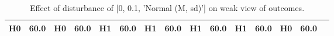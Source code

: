 \begin{table}
\begin{tabular}{l|cc|cc|cc|cc|cc|cc|cc}
\cellcolor{Bittersweet}H0&\cellcolor{Bittersweet}60.0&\cellcolor{Bittersweet}H0&\cellcolor{Bittersweet}60.0&\cellcolor{Bittersweet}H1&\cellcolor{Bittersweet}60.0&\cellcolor{Bittersweet}H1&\cellcolor{Bittersweet}60.0&\cellcolor{Bittersweet}H1&\cellcolor{Bittersweet}60.0&\cellcolor{Bittersweet}H1&\cellcolor{Bittersweet}60.0&\cellcolor{Bittersweet}H0&\cellcolor{Bittersweet}60.0\\\bottomrule\end{tabular}\caption{Effect of disturbance of [0, 0.1, 'Normal (M, sd)'] on weak view of outcomes.}\end{table}